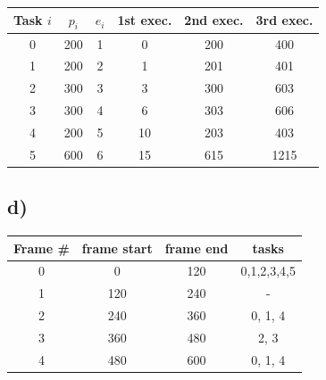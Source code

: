 \documentclass[10pt,a4paper]{article}
\begin{document}
\begin{tabular}{| c | c | c || c | c | c |}
  \hline
  Task $i$ & $p_i$ & $e_i$ & 1st exec. & 2nd exec. & 3rd exec. \\
  \hline
  0 & 200 & 1 & 0 & 200 & 400 \\
  \hline
  1 & 200 & 2 & 1 & 201 & 401 \\
  \hline
  2 & 300 & 3 & 3 & 300 & 603 \\
  \hline
  3 & 300 & 4 & 6 & 303 & 606 \\
  \hline
  4 & 200 & 5 & 10 & 203 & 403 \\
  \hline
  5 & 600 & 6 & 15 & 615 & 1215 \\
  \hline
\end{tabular}

\subsection*{d)}
\begin{tabular}{| c | c | c | c |}
\hline
Frame \# & frame start & frame end & tasks \\
\hline
0 & 0 & 120 & 0,1,2,3,4,5 \\
\hline
1 & 120 & 240 & - \\
\hline
2 & 240 & 360 & 0, 1, 4 \\
\hline
3 & 360 & 480 & 2, 3 \\
\hline
4 & 480 & 600 & 0, 1, 4 \\
\hline
\end{tabular}
\end{document}
